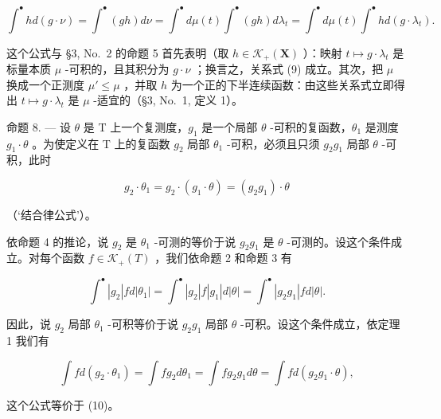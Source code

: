 \[
\int^ {\bullet} h d (g \cdot \nu) = \int^ {\bullet} (g h) d \nu = \int^ {\bullet} d \mu (t) \int^ {\bullet} (g h) d \lambda_ {t} = \int^ {\bullet} d \mu (t) \int^ {\bullet} h d (g \cdot \lambda_ {t}).
\]

这个公式与 §3, No.~2 的命题 5 首先表明（取 \(h \in \mathcal{K}_{+}(\mathbf{X})\) ）：映射 \(t \mapsto g \cdot \lambda_{t}\) 是标量本质 \(\mu\) -可积的，且其积分为 \(g \cdot \nu\) ；换言之，关系式 (9) 成立。其次，把 \(\mu\) 换成一个正测度 \(\mu' \leqslant \mu\) ，并取 \(h\) 为一个正的下半连续函数：由这些关系式立即得出 \(t \mapsto g \cdot \lambda_{t}\) 是 \(\mu\) -适宜的（§3, No.~1, 定义 1）。

命题 8. --- 设 \(\theta\) 是 T 上一个复测度，\(g_{1}\) 是一个局部 \(\theta\) -可积的复函数，\(\theta_{1}\) 是测度 \(g_{1} \cdot \theta\) 。为使定义在 T 上的复函数 \(g_{2}\) 局部 \(\theta_{1}\) -可积，必须且只须 \(g_{2} g_{1}\) 局部 \(\theta\) -可积，此时

\[
g _ {2} \cdot \theta_ {1} = g _ {2} \cdot (g _ {1} \cdot \theta) = (g _ {2} g _ {1}) \cdot \theta\tag{10}
\]

（`结合律公式'）。

依命题 4 的推论，说 \(g_{2}\) 是 \(\theta_{1}\) -可测的等价于说 \(g_{2}g_{1}\) 是 \(\theta\) -可测的。设这个条件成立。对每个函数 \(f \in \mathcal{K}_{+}(T)\) ，我们依命题 2 和命题 3 有

\[
\int^ {\bullet} | g _ {2} | f d | \theta_ {1} | = \int^ {\bullet} | g _ {2} | f | g _ {1} | d | \theta | = \int^ {\bullet} | g _ {2} g _ {1} | f d | \theta |.
\]

因此，说 \(g_{2}\) 局部 \(\theta_{1}\) -可积等价于说 \(g_{2}g_{1}\) 局部 \(\theta\) -可积。设这个条件成立，依定理 1 我们有

\[
\int f d \left(g _ {2} \cdot \theta_ {1}\right) = \int f g _ {2} d \theta_ {1} = \int f g _ {2} g _ {1} d \theta = \int f d \left(g _ {2} g _ {1} \cdot \theta\right),
\]

这个公式等价于 (10)。
\relax{}
